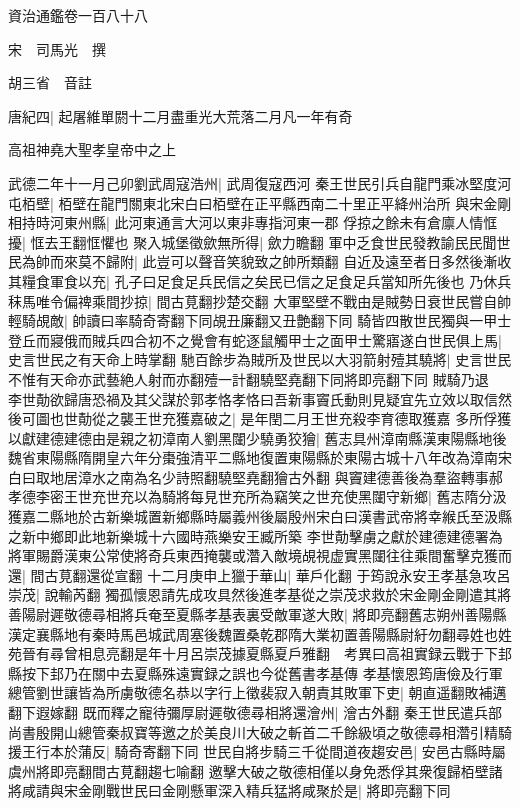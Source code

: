 資治通鑑卷一百八十八

宋　司馬光　撰

胡三省　音註

唐紀四|{
	起屠維單閼十二月盡重光大荒落二月凡一年有奇}


高祖神堯大聖孝皇帝中之上

武德二年十一月己卯劉武周寇浩州|{
	武周復寇西河}
秦王世民引兵自龍門乘冰堅度河屯栢壁|{
	栢壁在龍門關東北宋白曰栢壁在正平縣西南二十里正平絳州治所}
與宋金剛相持時河東州縣|{
	此河東通言大河以東非專指河東一郡}
俘掠之餘未有倉廪人情恇擾|{
	恇去王翻恇懼也}
聚入城堡徵歛無所得|{
	歛力瞻翻}
軍中乏食世民發教諭民民聞世民為帥而來莫不歸附|{
	此豈可以聲音笑貌致之帥所類翻}
自近及遠至者日多然後漸收其糧食軍食以充|{
	孔子曰足食足兵民信之矣民已信之足食足兵當知所先後也}
乃休兵秣馬唯令偏禆乘間抄掠|{
	間古莧翻抄楚交翻}
大軍堅壁不戰由是賊勢日衰世民嘗自帥輕騎覘敵|{
	帥讀曰率騎奇寄翻下同覘丑廉翻又丑艶翻下同}
騎皆四散世民獨與一甲士登丘而寢俄而賊兵四合初不之覺會有蛇逐鼠觸甲士之面甲士驚寤遂白世民俱上馬|{
	史言世民之有天命上時掌翻}
馳百餘步為賊所及世民以大羽箭射殪其驍將|{
	史言世民不惟有天命亦武藝絶人射而亦翻殪一計翻驍堅堯翻下同將即亮翻下同}
賊騎乃退　李世勣欲歸唐恐禍及其父謀於郭孝恪孝恪曰吾新事竇氏動則見疑宜先立效以取信然後可圖也世勣從之襲王世充獲嘉破之|{
	是年閏二月王世充殺李育德取獲嘉}
多所俘獲以獻建德建德由是親之初漳南人劉黑闥少驍勇狡獪|{
	舊志具州漳南縣漢東陽縣地後魏省東陽縣隋開皇六年分棗強清平二縣地復置東陽縣於東陽古城十八年改為漳南宋白曰取地居漳水之南為名少詩照翻驍堅堯翻獪古外翻}
與竇建德善後為羣盜轉事郝孝德李密王世充世充以為騎將每見世充所為竊笑之世充使黑闥守新鄉|{
	舊志隋分汲獲嘉二縣地於古新樂城置新鄉縣時屬義州後屬殷州宋白曰漢書武帝將幸緱氏至汲縣之新中鄉即此地新樂城十六國時燕樂安王臧所築}
李世勣擊虜之獻於建德建德署為將軍賜爵漢東公常使將奇兵東西掩襲或濳入敵境覘視虚實黑闥往往乘間奮擊克獲而還|{
	間古莧翻還從宣翻}
十二月庚申上獵于華山|{
	華戶化翻}
于筠說永安王孝基急攻呂崇茂|{
	說輸芮翻}
獨孤懷恩請先成攻具然後進孝基從之崇茂求救於宋金剛金剛遣其將善陽尉遲敬德尋相將兵奄至夏縣孝基表裏受敵軍遂大敗|{
	將即亮翻舊志朔州善陽縣漢定襄縣地有秦時馬邑城武周塞後魏置桑乾郡隋大業初置善陽縣尉紆勿翻尋姓也姓苑晉有尋曾相息亮翻是年十月呂崇茂據夏縣夏戶雅翻　考異曰高祖實録云戰于下邽縣按下邽乃在關中去夏縣殊遠實録之誤也今從舊書孝基傳}
孝基懷恩筠唐儉及行軍總管劉世讓皆為所虜敬德名恭以字行上徵裴寂入朝責其敗軍下吏|{
	朝直遥翻敗補邁翻下遐嫁翻}
既而釋之寵待彌厚尉遲敬德尋相將還澮州|{
	澮古外翻}
秦王世民遣兵部尚書殷開山總管秦叔寶等邀之於美良川大破之斬首二千餘級頃之敬德尋相濳引精騎援王行本於蒲反|{
	騎奇寄翻下同}
世民自將步騎三千從間道夜趨安邑|{
	安邑古縣時屬虞州將即亮翻間古莧翻趨七喻翻}
邀擊大破之敬德相僅以身免悉俘其衆復歸栢壁諸將咸請與宋金剛戰世民曰金剛懸軍深入精兵猛將咸聚於是|{
	將即亮翻下同}
